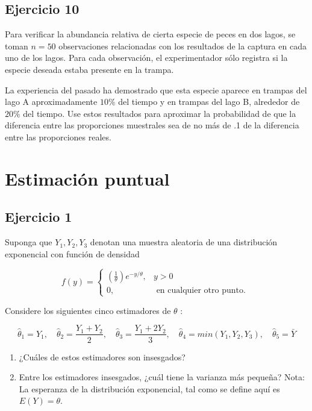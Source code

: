 \documentclass[
]{article}
\providecommand{\tightlist}{%
  \setlength{\itemsep}{0pt}\setlength{\parskip}{0pt}}
\begin{document}
\subsection{Ejercicio 10}\label{ejercicio-10}

Para verificar la abundancia relativa de cierta especie de peces en dos lagos, se toman \(n=50\) observaciones relacionadas con los resultados de la captura en cada uno de los lagos. Para cada observación, el experimentador sólo registra si la especie deseada estaba presente en la trampa.

La experiencia del pasado ha demostrado que esta especie aparece en trampas del lago A aproximadamente \(10 \%\) del tiempo y en trampas del lago B, alrededor de \(20 \%\) del tiempo. Use estos resultados para aproximar la probabilidad de que la diferencia entre las proporciones muestrales sea de no más de .1 de la diferencia entre las proporciones reales.

\section{Estimación puntual}\label{estimaciuxf3n-puntual}

\subsection{Ejercicio 1}\label{ejercicio-1-2}

Suponga que \(Y_{1}, Y_{2}, Y_{3}\) denotan una muestra aleatoria de una distribución exponencial con función de densidad

\[
f(y)= \begin{cases}\left(\frac{1}{\theta}\right) e^{-y / \theta}, & y>0 \\ 0, & \text { en cualquier otro punto. }\end{cases}
\]

Considere los siguientes cinco estimadores de \(\theta\) :

\[
\hat{\theta}_{1}=Y_{1}, \quad \hat{\theta}_{2}=\frac{Y_{1}+Y_{2}}{2}, \quad \hat{\theta}_{3}=\frac{Y_{1}+2 Y_{2}}{3}, \quad \hat{\theta}_{4}=min\left(Y_{1}, Y_{2}, Y_{3}\right), \quad \hat{\theta}_{5}=\bar{Y}
\]

\begin{enumerate}
\def\labelenumi{\alph{enumi}.}
\tightlist
\item
  ¿Cuáles de estos estimadores son insesgados?
\item
  Entre los estimadores insesgados, ¿cuál tiene la varianza más pequeña?
  Nota: La esperanza de la distribución exponencial, tal como se define aquí es \(E(Y)= \theta\).
\end{enumerate}
\end{document}
